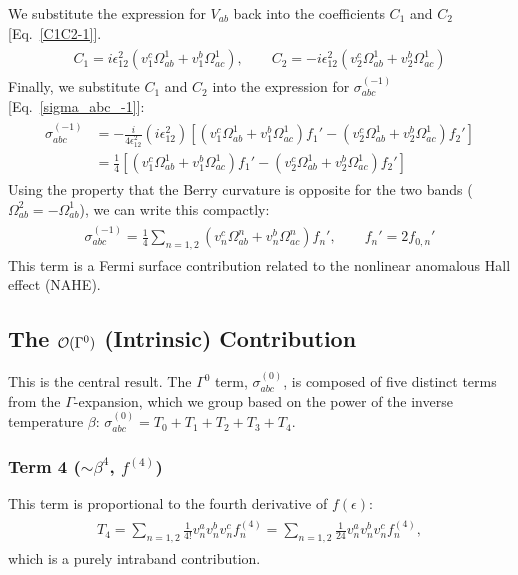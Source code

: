 \documentclass[twocolumn, prx, reprint, amsfonts, amsmath, amssymb, longbibliography, floatfix, aps]{revtex4-2}
\begin{document}
We substitute the expression for $V_{ab}$ back into the coefficients $C_1$ and $C_2$ [Eq.~\eqref{C1C2-1}].
\begin{align}
\begin{aligned}
C_1 = i \epsilon_{12}^2 (v_1^c \Omega_{ab}^1 + v_1^b \Omega_{ac}^1),
\qquad
C_2 = -i \epsilon_{12}^2 (v_2^c \Omega_{ab}^1 + v_2^b \Omega_{ac}^1)
\end{aligned}
\end{align}
Finally, we substitute $C_1$ and $C_2$ into the expression for $\sigma_{abc}^{(-1)}$ [Eq.~\eqref{sigma_abc_-1}]:
\begin{align}
\begin{aligned}
\sigma_{abc}^{(-1)} &= -\frac{i}{4\epsilon_{12}^2} (i \epsilon_{12}^2) \left[ (v_1^c \Omega_{ab}^1 + v_1^b \Omega_{ac}^1) f_1' - (v_2^c \Omega_{ab}^1 + v_2^b \Omega_{ac}^1) f_2' \right] \\
&= \frac{1}{4} \left[ (v_1^c \Omega_{ab}^1 + v_1^b \Omega_{ac}^1) f_1' - (v_2^c \Omega_{ab}^1 + v_2^b \Omega_{ac}^1) f_2' \right]
\end{aligned}
\end{align}
Using the property that the Berry curvature is opposite for the two bands ($\Omega_{ab}^2 = -\Omega_{ab}^1$), we can write this compactly:
\begin{align}
\begin{aligned}
\sigma_{abc}^{(-1)} = \frac{1}{4} \sum_{n=1,2} (v_n^c \Omega_{ab}^n + v_n^b \Omega_{ac}^n) f_n',
\qquad
f_n' = 2f_{0,n}'
\end{aligned}
\end{align}
This term is a Fermi surface contribution related to the nonlinear anomalous Hall effect (NAHE).

\subsection{The \texorpdfstring{${\cal O}(\Gamma^{0})$}{O(Gamma-0)} (Intrinsic) Contribution}
\label{Two-band Intrinsic}

This is the central result. The $\Gamma^0$ term, $\sigma_{abc}^{(0)}$, is composed of five distinct terms from the $\Gamma$-expansion, which we group based on the power of the inverse temperature $\beta$:
$\sigma_{abc}^{(0)} = T_0 + T_1 + T_2 + T_3 + T_4$.

\subsubsection*{Term 4 (\texorpdfstring{$\sim \beta^4$}{~beta4}, \texorpdfstring{$f^{(4)}$}{f4})}
This term is proportional to the fourth derivative of $f(\epsilon)$:
\begin{align}
\begin{aligned}
T_4 = \sum_{n=1,2} \frac{1}{4!} v_n^a v_n^b v_n^c f_n^{(4)} = \sum_{n=1,2} \frac{1}{24} v_n^a v_n^b v_n^c f_n^{(4)},
\end{aligned}
\end{align}
which is a purely intraband contribution.
\end{document}
